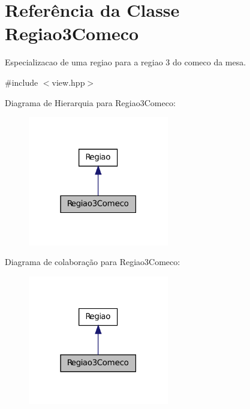 \hypertarget{classRegiao3Comeco}{
\section{Referência da Classe Regiao3Comeco}
\label{classRegiao3Comeco}
}


Especializacao de uma regiao para a regiao 3 do comeco da mesa.  




{\ttfamily \#include $<$view.hpp$>$}



Diagrama de Hierarquia para Regiao3Comeco:\nopagebreak
\begin{figure}[H]
\begin{center}
\leavevmode
\includegraphics[width=174pt]{classRegiao3Comeco__inherit__graph}
\end{center}
\end{figure}


Diagrama de colaboração para Regiao3Comeco:\nopagebreak
\begin{figure}[H]
\begin{center}
\leavevmode
\includegraphics[width=174pt]{classRegiao3Comeco__coll__graph}
\end{center}
\end{figure}
